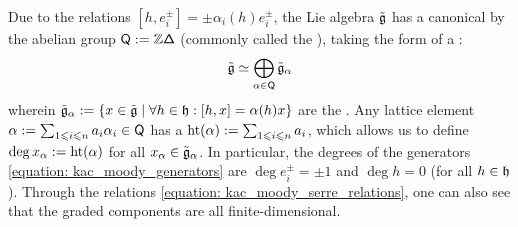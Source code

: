         Due to the relations $[h, e_i^{\pm}] = \pm \alpha_i(h) e_i^{\pm}$, the Lie algebra $\tilde{\mathfrak{g}}$ has a canonical  by the abelian group $\mathsf{Q} := \mathbb{Z} \mathsf{\Delta}$ (commonly called the ), taking the form of a :
            $$\tilde{\mathfrak{g}} \simeq \bigoplus_{\alpha \in \mathsf{Q}} \tilde{\mathfrak{g}}_{\alpha}$$
        wherein $\tilde{\mathfrak{g}}_{\alpha} := \{ x \in \tilde{\mathfrak{g}} \mid \forall h \in \mathfrak{h}: [h, x] = \alpha(h) x \}$ are the . Any lattice element $\alpha := \sum_{1 \leqslant i \leqslant n} a_i \alpha_i \in \mathsf{Q}$ has a  $\operatorname{ht}(\alpha) := \sum_{1 \leqslant i \leqslant n} a_i$, which allows us to define $\deg x_{\alpha} := \operatorname{ht}(\alpha)$ for all $x_{\alpha} \in \tilde{\mathfrak{g}}_{\alpha}$. In particular, the degrees of the generators \eqref{equation: kac_moody_generators} are $\deg e_i^{\pm} = \pm 1$ and $\deg h = 0$ (for all $h \in \mathfrak{h}$). Through the relations \eqref{equation: kac_moody_serre_relations}, one can also see that the graded components are all finite-dimensional.

